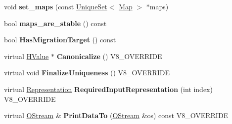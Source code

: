 \begin{DoxyCompactItemize}
\item 
\hypertarget{classv8_1_1internal_1_1_v8___f_i_n_a_l_a7bb2edaac420fd50d64a28a114eab498}{}void {\bfseries set\+\_\+maps} (const \hyperlink{classv8_1_1internal_1_1_unique_set}{Unique\+Set}$<$ \hyperlink{classv8_1_1internal_1_1_map}{Map} $>$ $\ast$maps)\label{classv8_1_1internal_1_1_v8___f_i_n_a_l_a7bb2edaac420fd50d64a28a114eab498}

\item 
\hypertarget{classv8_1_1internal_1_1_v8___f_i_n_a_l_a8fd1a1a3cb010c98c4b9937c4d7196eb}{}bool {\bfseries maps\+\_\+are\+\_\+stable} () const \label{classv8_1_1internal_1_1_v8___f_i_n_a_l_a8fd1a1a3cb010c98c4b9937c4d7196eb}

\item 
\hypertarget{classv8_1_1internal_1_1_v8___f_i_n_a_l_afb1f123496452a97c484f98e525dcdfd}{}bool {\bfseries Has\+Migration\+Target} () const \label{classv8_1_1internal_1_1_v8___f_i_n_a_l_afb1f123496452a97c484f98e525dcdfd}

\item 
\hypertarget{classv8_1_1internal_1_1_v8___f_i_n_a_l_aad5f871e0a6782c02e742ec017eca3cd}{}virtual \hyperlink{classv8_1_1internal_1_1_h_value}{H\+Value} $\ast$ {\bfseries Canonicalize} () V8\+\_\+\+O\+V\+E\+R\+R\+I\+D\+E\label{classv8_1_1internal_1_1_v8___f_i_n_a_l_aad5f871e0a6782c02e742ec017eca3cd}

\item 
\hypertarget{classv8_1_1internal_1_1_v8___f_i_n_a_l_a935c3ddc60915dd102968e2b529aa1fc}{}virtual void {\bfseries Finalize\+Uniqueness} () V8\+\_\+\+O\+V\+E\+R\+R\+I\+D\+E\label{classv8_1_1internal_1_1_v8___f_i_n_a_l_a935c3ddc60915dd102968e2b529aa1fc}

\item 
\hypertarget{classv8_1_1internal_1_1_v8___f_i_n_a_l_a6c6d1f37f40b113d8f4062f1ffff7215}{}virtual \hyperlink{classv8_1_1internal_1_1_representation}{Representation} {\bfseries Required\+Input\+Representation} (int index) V8\+\_\+\+O\+V\+E\+R\+R\+I\+D\+E\label{classv8_1_1internal_1_1_v8___f_i_n_a_l_a6c6d1f37f40b113d8f4062f1ffff7215}

\item 
\hypertarget{classv8_1_1internal_1_1_v8___f_i_n_a_l_ac450dad970b14246be761ccf5004924b}{}virtual \hyperlink{classv8_1_1internal_1_1_o_stream}{O\+Stream} \& {\bfseries Print\+Data\+To} (\hyperlink{classv8_1_1internal_1_1_o_stream}{O\+Stream} \&os) const V8\+\_\+\+O\+V\+E\+R\+R\+I\+D\+E\label{classv8_1_1internal_1_1_v8___f_i_n_a_l_ac450dad970b14246be761ccf5004924b}


\end{DoxyCompactItemize}
